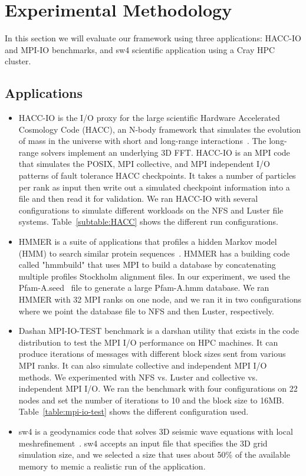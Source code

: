 \section{Experimental Methodology}\label{sec:methodology}
In this section we will evaluate our framework using three applications: HACC-IO and MPI-IO benchmarks, and sw4 scientific application using a Cray HPC cluster.

\subsection{Applications}
\begin{itemize}
	\item HACC-IO is the I/O proxy for the large scientific Hardware Accelerated Cosmology Code (HACC), an N-body framework that simulates the evolution of mass in the universe with short and long-range interactions~\cite{habib2013hacc}. The long-range solvers implement an underlying 3D FFT. HACC-IO is an MPI code that simulates the POSIX, MPI collective, and MPI independent I/O patterns of fault tolerance HACC checkpoints. It takes a number of particles per rank as input then write out a simulated checkpoint information into a file and then read it for validation. We ran HACC-IO with several configurations to simulate different workloads on the NFS and Luster file systems. Table~\ref{subtable:HACC} shows the different run configurations. 
	\item HMMER is a suite of applications that profiles a hidden Markov model (HMM) to search similar protein sequences~\cite{eddy1992hmmer}. HMMER has a building code called "hmmbuild" that uses MPI to build a database by concatenating multiple profiles Stockholm alignment files. In our experiment, we used the Pfam-A.seed~\cite{sonnhammer1998pfam} file to generate a large Pfam-A.hmm database. We ran HMMER with 32 MPI ranks on one node, and we ran it in two configurations where we point the database file to NFS and then Luster, respectively. 
	\item Dashan MPI-IO-TEST benchmark is a darshan utility that exists in the code distribution to test the MPI I/O performance on HPC machines. It can produce iterations of messages with different block sizes sent from various MPI ranks. It can also simulate collective and independent MPI I/O methods. We experimented with NFS vs. Luster and collective vs. independent MPI I/O. We ran the benchmark with four configurations on 22 nodes and set the number of iterations to 10 and the block size to 16MB. Table~\ref{table:mpi-io-test} shows the different configuration used.
	\item sw4 is a geodynamics code that solves 3D seismic wave equations with local meshrefinement~\cite{peterssonsw4}. sw4 accepts an input file that specifies the 3D grid simulation size, and we selected a size that uses about 50\% of the available memory to memic a realistic run of the application.
\end{itemize}

